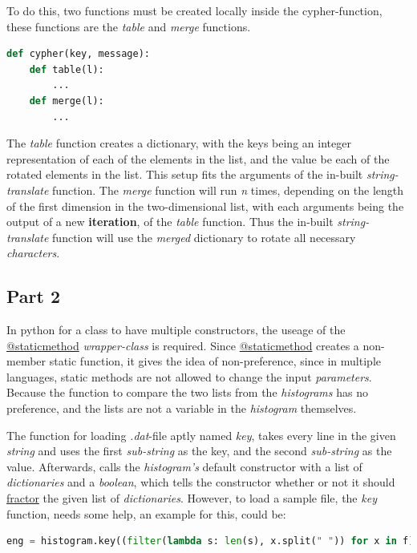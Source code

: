 \documentclass[a4paper,10pt]{article}
\begin{document}
To do this, two functions must be created locally inside the cypher-function, these functions are the \textit{table} and \textit{merge} functions.

\begin{lstlisting}[language=python]
def cypher(key, message):
    def table(l):
        ...
    def merge(l):
        ...
\end{lstlisting}

The \textit{table} function creates a dictionary, with the keys being an integer representation of each of the elements in the list, and the value be each of the rotated elements in the list. This setup fits the arguments of the in-built \textit{string-translate} function. The \textit{merge} function will run \textit{n} times, depending on the length of the first dimension in the two-dimensional list, with each arguments being the output of a new \textbf{iteration}, of the \textit{table} function. Thus the in-built \textit{string-translate} function will use the \textit{merged} dictionary to rotate all necessary \textit{characters}.

\newpage

\subsection{Part 2}

In python for a class to have multiple constructors, the useage of the \underline{@staticmethod} \textit{wrapper-class} is required. Since \underline{@staticmethod} creates a non-member static function, it gives the idea of non-preference, since in multiple languages, static methods are not allowed to change the input \textit{parameters}. Because the function to compare the two lists from the \textit{histograms} has no preference, and the lists are not a variable in the \textit{histogram} themselves.

The function for loading \textit{.dat}-file aptly named \textit{key}, takes every line in the given \textit{string} and uses the first \textit{sub-string} as the key, and the second \textit{sub-string} as the value. Afterwards, calls the \textit{histogram's} default constructor with a list of \textit{dictionaries} and a \textit{boolean}, which tells the constructor whether or not it should \underline{fractor} the given list of \textit{dictionaries}. However, to load a sample file, the \textit{key} function, needs some help, an example for this, could be:

\begin{lstlisting}[language=python]
eng = histogram.key((filter(lambda s: len(s), x.split(" ")) for x in f))
\end{lstlisting}
\end{document}
